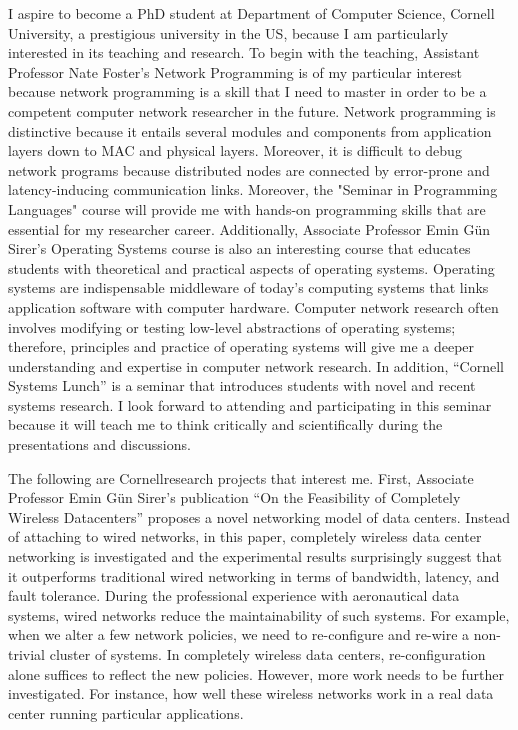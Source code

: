 \documentclass[a4paper,10pt]{report}
\newcommand{\university}{Cornell University}
\newcommand{\department}{Department of Computer Science}
\newcommand{\uniabbre}{Cornell}
\begin{document}
\vspace{0.2cm}
I aspire to become a PhD student at \department, \university, a prestigious university in the US, because I am particularly interested in its teaching and research. To begin with the teaching, Assistant Professor Nate Foster's Network Programming is of my particular interest because network programming is a skill that I need to master in order to be a competent computer network researcher in the future. Network programming is distinctive because it entails several modules and components from application layers down to MAC and physical layers. Moreover, it is difficult to debug network programs because distributed nodes are connected by error-prone and latency-inducing communication links. Moreover, the "Seminar in Programming Languages" course will provide me with hands-on programming skills that are essential for my researcher career. Additionally, Associate Professor Emin Gün Sirer's Operating Systems course is also an interesting course that educates students with theoretical and practical aspects of operating systems. Operating systems are indispensable middleware of today's computing systems that links application software with computer hardware. Computer network research often involves modifying or testing low-level abstractions of operating systems; therefore, principles and practice of operating systems will give me a deeper understanding and expertise in computer network research. In addition, ``Cornell Systems Lunch'' is a seminar that introduces students with novel and recent systems research. I look forward to attending and participating in this seminar because it will teach me to think critically and scientifically during the presentations and discussions.

\vspace{0.2cm}
The following are \uniabbre \space research projects that interest me. First, Associate Professor Emin Gün Sirer's publication ``On the Feasibility of Completely Wireless Datacenters'' proposes a novel networking model of data centers. Instead of attaching to wired networks, in this paper, completely wireless data center networking is investigated and the experimental results surprisingly suggest that it outperforms traditional wired networking in terms of bandwidth, latency, and fault tolerance. During the professional experience with aeronautical data systems, wired networks reduce the maintainability of such systems. For example, when we alter  a few network policies, we need to re-configure and re-wire a non-trivial cluster of systems. In completely wireless data centers, re-configuration alone suffices to reflect the new policies. However, more work needs to be further investigated. For instance, how well these wireless networks work in a real data center running particular applications. 
\end{document}
